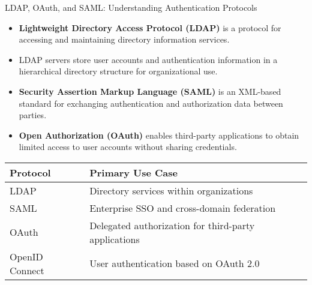 \documentclass{beamer}
\begin{document}
\begin{frame}{LDAP, OAuth, and SAML: Understanding Authentication Protocols}
    \begin{itemize}
        \item \textbf{Lightweight Directory Access Protocol (LDAP)} is a protocol for accessing and maintaining directory information services.
        \item LDAP servers store user accounts and authentication information in a hierarchical directory structure for organizational use.
        \item \textbf{Security Assertion Markup Language (SAML)} is an XML-based standard for exchanging authentication and authorization data between parties.
        \item \textbf{Open Authorization (OAuth)} enables third-party applications to obtain limited access to user accounts without sharing credentials.
    \end{itemize}
    
    \begin{table}
        \begin{tabular}{|l|l|}
            \hline
            \textbf{Protocol} & \textbf{Primary Use Case} \\
            \hline
            LDAP & Directory services within organizations \\
            SAML & Enterprise SSO and cross-domain federation \\
            OAuth & Delegated authorization for third-party applications \\
            OpenID Connect & User authentication based on OAuth 2.0 \\
            \hline
        \end{tabular}
    \end{table}
\end{frame}
\end{document}
